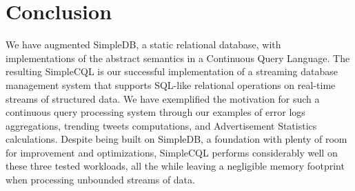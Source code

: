 \documentclass[a4paper, 10pt, conference]{IEEEconf}
\begin{document}
\section{Conclusion}
We have augmented SimpleDB, a static relational database, with implementations of the abstract semantics in a Continuous Query Language. The resulting SimpleCQL is our successful implementation of a streaming database management system that supports SQL-like relational operations on real-time streams of structured data. We have exemplified the motivation for such a continuous query processing system through our examples of error logs aggregations, trending tweets computations, and Advertisement Statistics calculations. Despite being built on SimpleDB, a foundation with plenty of room for improvement and optimizations, SimpleCQL performs considerably well on these three tested workloads, all the while leaving a negligible memory footprint when processing unbounded streams of data.



\end{document}
